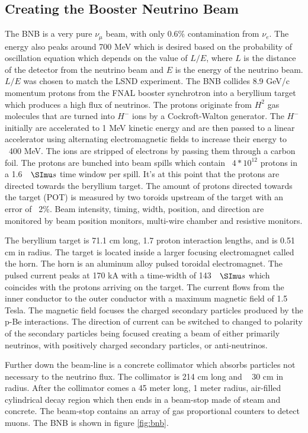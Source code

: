 \subsection{Creating the Booster Neutrino Beam}
The BNB is a very pure $\nu_{\mu}$ beam, with only 0.6\% contamination from $\nu_{e}$. The energy also peaks around 700 MeV which is desired based on the probability of oscillation equation which depends on the value of $L/E$, where $L$ is the distance of the detector from the neutrino beam and $E$ is the energy of the neutrino beam. $L/E$ was chosen to match the LSND experiment. The BNB collides 8.9 GeV/c momentum protons from the FNAL booster synchrotron into a beryllium target which produces a high flux of neutrinos. The protons originate from $H^2$ gas molecules that are turned into $H^-$ ions by a Cockroft-Walton generator. The $H^-$ initially are accelerated to 1 MeV kinetic energy and are then passed to a linear accelerator using alternating electromagnetic fields to increase their energy to ~400 MeV. The ions are stripped of electrons by passing them through a carbon foil. The protons are bunched into beam spills which contain ~$4*10^{12}$ protons in a 1.6 $\micro s$ time window per spill. 
It's at this point that the protons are directed towards the beryllium target. The amount of protons directed towards the target (POT) is measured by two toroids upstream of the target with an error of ~2$\%$. Beam intensity, timing, width, position, and direction are monitored by beam position monitors, multi-wire chamber and resistive monitors. 

The beryllium target is 71.1 cm long, 1.7 proton interaction lengths, and is 0.51 cm in radius. The target is located inside a larger focusing electromagnet called the horn. The horn is an aluminum alloy pulsed toroidal electromagnet. The pulsed current peaks at 170 kA with a time-width of 143 $\micro s$ which coincides with the protons arriving on the target. The current flows from the inner conductor to the outer conductor with a maximum magnetic field of 1.5 Tesla. The magnetic field focuses the charged secondary particles produced by the p-Be interactions. The direction of current can be switched to changed to polarity of the secondary particles being focused creating a beam of either primarily neutrinos, with positively charged secondary particles, or anti-neutrinos. 

Further down the beam-line is a concrete collimator which absorbs particles not necessary to the neutrino flux. The collimator is 214 cm long and ~ 30 cm in radius. After the collimator comes a 45 meter long, 1 meter radius, air-filled cylindrical decay region which then ends in a beam-stop made of steam and concrete. The beam-stop contains an array of gas proportional counters to detect muons. The BNB is shown in figure \ref{fig:bnb}.      


